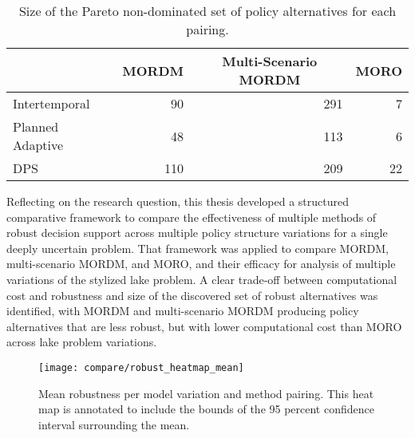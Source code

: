 \begin{table}[b]
    \centering
    \captionsetup{width=0.85\textwidth}
    \caption[Size of non-dominated policy alternative sets]{Size of the Pareto non-dominated set of policy alternatives for each pairing.}
    \label{table:summary-pareto-size}
    
    \setlength\arrayrulewidth{1pt}
    \begin{tabularx}{.85\linewidth}{l|r|r|r}
        \rowcolor{tudelft-dark-blue!80}
        & \multicolumn{1}{c|}{\color{white} \textbf{MORDM}}
        & \multicolumn{1}{c|}{\color{white} \textbf{Multi-Scenario MORDM}}
        & \multicolumn{1}{c}{\color{white} \textbf{MORO}} \\ \hline
        
        Intertemporal       & 90    & 291   & 7     \\ \hline
        Planned Adaptive    & 48    & 113   & 6     \\ \hline
        DPS                 & 110   & 209   & 22    \\ \hline
    \end{tabularx}
\end{table}

Reflecting on the research question, this thesis developed a structured comparative framework to compare the effectiveness of multiple methods of robust decision support across multiple policy structure variations for a single deeply uncertain problem. That framework was applied to compare MORDM, multi-scenario MORDM, and MORO, and their efficacy for analysis of multiple variations of the stylized lake problem. A clear trade-off between computational cost and robustness and size of the discovered set of robust alternatives was identified, with MORDM and multi-scenario MORDM producing policy alternatives that are less robust, but with lower computational cost than MORO across lake problem variations. 

\begin{figure}[t!]
    \centering
    \captionsetup{width=0.8\textwidth}
    
    \texttt{[image: compare/robust\_heatmap\_mean]}
    \caption[Mean robustness per outcome of interest across all pairings]{Mean robustness per model variation and method pairing. This heat map is annotated to include the bounds of the 95 percent confidence interval surrounding the mean.}
    \label{fig:summary-robust-heatmap-mean}
\end{figure}

